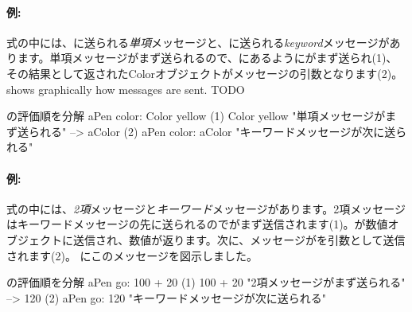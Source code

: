 \documentclass[a4paper,10pt,twoside]{book}
\begin{document}


\paragraph{例:}
式の中には、に送られる\emph{単項}メッセージと、に送られる\emph{keyword}メッセージがあります。単項メッセージがまず送られるので、にあるようにがまず送られ(1)、その結果として返されたColorオブジェクトがメッセージの引数となります(2)。
 shows graphically how messages are sent. TODO

\begin{example}[decColor]{の評価順を分解}{}
        aPen color: Color yellow
(1)                       Color yellow        "単項メッセージがまず送られる"
                        --> aColor
(2)   aPen color: aColor                 "キーワードメッセージが次に送られる"
\end{example}

\paragraph{例:} 式の中には、\emph{2項}メッセージと\emph{キーワード}メッセージがあります。2項メッセージはキーワードメッセージの先に送られるのでがまず送信されます(1)。が数値オブジェクトに送信され、数値が返ります。次に、メッセージがを引数として送信されます(2)。
にこのメッセージを図示しました。

\begin{example}[decGo]{の評価順を分解}{}
      aPen go: 100 + 20   
(1)                 100 + 20           "2項メッセージがまず送られる"
                   -->   120
(2)  aPen go: 120                   "キーワードメッセージが次に送られる"
\end{example}
\end{document}
